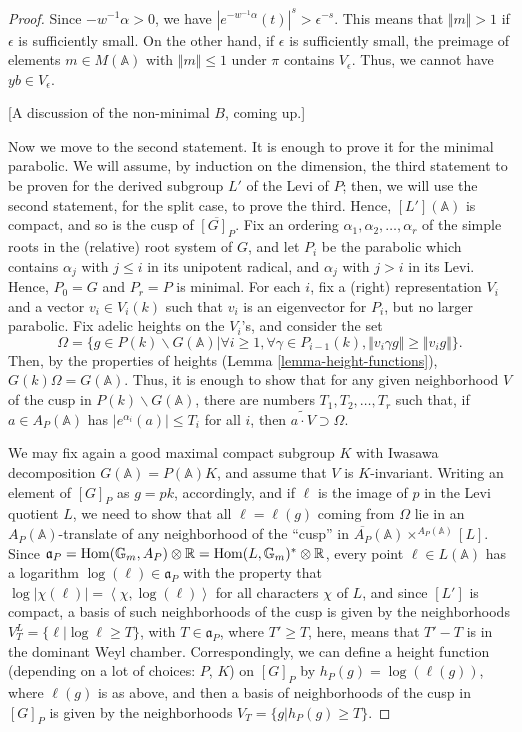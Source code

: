 \begin{proof}
Since $-w^{-1}\alpha>0$, we have $|e^{-w^{-1}\alpha}(t)|^s > \epsilon^{-s}$. This means that $\Vert m \Vert >1$ if $\epsilon$ is sufficiently small. On the other hand, if $\epsilon$ is sufficiently small, the preimage of elements $m\in M(\mathbb A)$ with $\Vert m\Vert \le 1$ under $\pi$ contains $V_\epsilon$. Thus, we cannot have $yb \in V_\epsilon$.



 
 
 [A discussion of the non-minimal $B$, coming up.]
 
 
 Now we move to the second statement. It is enough to prove it for the minimal parabolic. We will assume, by induction on the dimension, the third statement to be proven for the derived subgroup $L'$ of the Levi of $P$; then, we will use the second statement, for the split case, to prove the third. Hence, $[L'](\mathbb A)$ is compact, and so is the cusp of $\overline{[G]_P}$. Fix an ordering $\alpha_1, \alpha_2, \dots,\alpha_r$ of the simple roots in the (relative) root system of $G$, and let $P_i$ be the parabolic which contains $\alpha_j$ with $j\le i$ in its unipotent radical, and $\alpha_j$ with $j>i$ in its Levi. Hence, $P_0=G$ and $P_r=P$ is minimal. For each $i$, fix a (right) representation $V_i$ and a vector $v_i \in V_i(k)$ such that $v_i$ is an eigenvector for $P_i$, but no larger parabolic. Fix adelic heights on the $V_i$'s, and consider the set 
 $$ \Omega = \{g \in P(k)\backslash G(\mathbb A) | \forall i \ge 1, \forall \gamma \in P_{i-1}(k), \Vert v_i \gamma g \Vert \ge \Vert  v_i g\Vert\}.$$
 Then, by the properties of heights (Lemma \ref{lemma-height-functions}), $G(k)\Omega = G(\mathbb A)$. Thus, it is enough to show that for any given neighborhood $V$ of the cusp in $P(k)\backslash G(\mathbb A)$, there are numbers $T_1, T_2, \dots, T_r$ such that, if $a\in A_P(\mathbb A)$ has $|e^{\alpha_i}(a)|\le T_i$ for all $i$, then $\widetilde{a\cdot V} \supset \Omega$.
 
 We may fix again a good maximal compact subgroup $K$ with Iwasawa decomposition $G(\mathbb A) = P(\mathbb A)K$, and assume that $V$ is $K$-invariant. Writing an element of $[G]_P$ as $g=pk$, accordingly, and if $\ell$ is the image of $p$ in the Levi quotient $L$, we need to show that all $\ell = \ell(g)$ coming from $\Omega$ lie in an $A_P(\mathbb A)$-translate of any neighborhood of the ``cusp'' in $\overline{A_P}(\mathbb A)\times^{A_P(\mathbb A)} [L]$. Since $\mathfrak a_P = \mathop{\rm Hom}\nolimits(\mathbb G_m,A_P)\otimes\mathbb R = \mathop{\rm Hom}\nolimits(L, \mathbb G_m)^*\otimes\mathbb R$, every point $\ell \in L(\mathbb A)$ has a logarithm $\log(\ell) \in \mathfrak a_P$ with the property that $\log |\chi(\ell)| = \left< \chi, \log(\ell)\right>$ for all characters $\chi$ of $L$, and since $[L']$ is compact, a basis of such neighborhoods of the cusp is given by the neighborhoods $V^L_T=\{ \ell| \log \ell \ge T\}$, with $T\in\mathfrak a_P$, where $ T'\ge T$, here,  means that $T'-T$ is in the dominant Weyl chamber. Correspondingly, we can define a height function (depending on a lot of choices: $P$, $K$) on $[G]_P$ by $h_P(g) = \log (\ell(g))$, where $\ell(g)$ is as above, and then a basis of neighborhoods of the cusp in $[G]_P$ is given by the neighborhoods $V_T=\{ g | h_P(g)  \ge T\}$. 
 

\end{proof}
